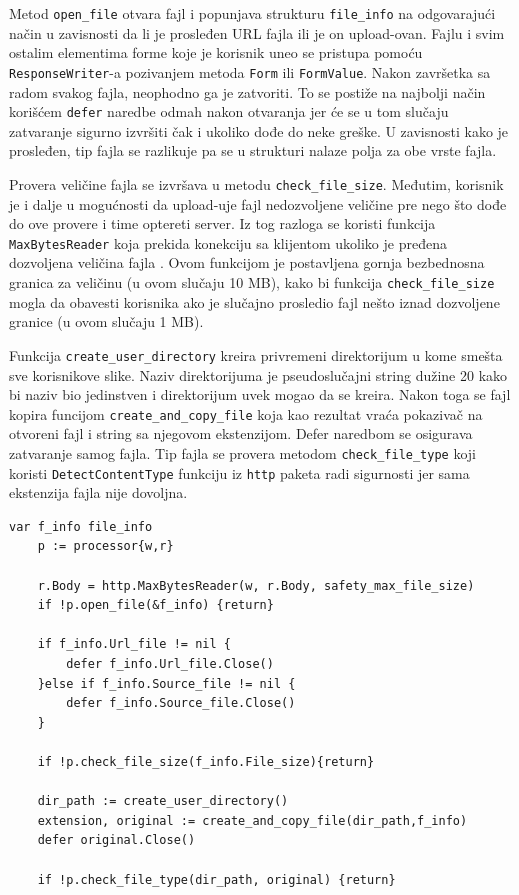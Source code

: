 \documentclass[12pt,oneside]{memoir}
\begin{document}
Metod \texttt{open\_file} otvara fajl i popunjava strukturu \texttt{file\_info} na odgovarajući način u zavisnosti da li je prosleđen URL fajla ili je on upload-ovan. Fajlu i svim ostalim elementima forme koje je korisnik uneo se pristupa pomoću \texttt{ResponseWriter}-a pozivanjem metoda \texttt{Form} ili \texttt{FormValue}. Nakon završetka sa radom svakog fajla, neophodno ga je zatvoriti. To se postiže na najbolji način korišćem \texttt{defer} naredbe odmah nakon otvaranja jer će se u tom slučaju zatvaranje sigurno izvršiti čak i ukoliko dođe do neke greške. U zavisnosti kako je prosleđen, tip fajla se razlikuje pa se u strukturi nalaze polja za obe vrste fajla. 

Provera veličine fajla se izvršava u metodu \texttt{check\_file\_size}. Međutim, korisnik je i dalje u mogućnosti da upload-uje fajl nedozvoljene veličine pre nego što dođe do ove provere i time optereti server. Iz tog razloga se koristi funkcija \texttt{MaxBytesReader} koja prekida konekciju sa klijentom ukoliko je pređena dozvoljena veličina fajla \cite{http}. Ovom funkcijom je postavljena gornja bezbednosna granica za veličinu (u ovom slučaju 10 MB), kako bi funkcija \texttt{check\_file\_size} mogla da obavesti korisnika ako je slučajno prosledio fajl nešto iznad dozvoljene granice (u ovom slučaju 1 MB). 

Funkcija \texttt{create\_user\_directory} kreira privremeni direktorijum u kome smešta sve korisnikove slike. Naziv direktorijuma je pseudoslučajni string dužine 20 kako bi naziv bio jedinstven i direktorijum uvek mogao da se kreira. Nakon toga se fajl kopira funcijom \texttt{create\_and\_copy\_file} koja kao rezultat vraća pokazivač na otvoreni fajl i string sa njegovom ekstenzijom. Defer naredbom se osigurava zatvaranje samog fajla. Tip fajla se provera metodom  \texttt{check\_file\_type} koji koristi \texttt{DetectContentType} funkciju iz \texttt{http} paketa radi sigurnosti jer sama ekstenzija fajla nije dovoljna.

\begin{center}
\begin{lstlisting}[caption=Otvaranje i provera fajla u funkciji ImageHandler,label={lst:open},  backgroundcolor=\color{background}]
	var f_info file_info
	p := processor{w,r}

	r.Body = http.MaxBytesReader(w, r.Body, safety_max_file_size)
	if !p.open_file(&f_info) {return}

	if f_info.Url_file != nil {
		defer f_info.Url_file.Close()
	}else if f_info.Source_file != nil {
		defer f_info.Source_file.Close()
	}

	if !p.check_file_size(f_info.File_size){return}

	dir_path := create_user_directory()
	extension, original := create_and_copy_file(dir_path,f_info)
	defer original.Close()

	if !p.check_file_type(dir_path, original) {return}
\end{lstlisting}
\end{center}
 
\end{document}
